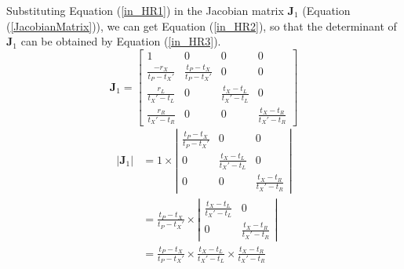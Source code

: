 \documentclass{bmcart}
\begin{document}
\begin{backmatter}
Substituting Equation (\ref{in_HR1}) in the Jacobian matrix ${{\mathbf{J}}_1}$ (Equation (\ref{JacobianMatrix})), we can get Equation (\ref{in_HR2}), so that the determinant of ${{\mathbf{J}}_1}$ can be obtained by Equation (\ref{in_HR3}).
\begin{equation}\label{in_HR2}
{{\mathbf{J}}_1} = \left[ {\begin{array}{*{20}{c}}
  1&0&0&0 \\
  {\frac{{ - {r_X}}}{{{t_P} - {t_X}'}}}&{\frac{{{t_P} - {t_X}}}{{{t_P} - {t_X}'}}}&0&0 \\
  {\frac{{{r_L}}}{{{t_X}' - {t_L}}}}&0&{\frac{{{t_X} - {t_L}}}{{{t_X}' - {t_L}}}}&0 \\
  {\frac{{{r_R}}}{{{t_X}' - {t_R}}}}&0&0&{\frac{{{t_X} - {t_R}}}{{{t_X}' - {t_R}}}}
\end{array}} \right]
\end{equation}
\begin{equation}\label{in_HR3}
\begin{aligned}
\left| {{{\mathbf{J}}_1}} \right| &= 1 \times \left| {\begin{array}{*{20}{c}}
  {\frac{{{t_P} - {t_X}}}{{{t_P} - {t_X}'}}}&0&0 \\
  0&{\frac{{{t_X} - {t_L}}}{{{t_X}' - {t_L}}}}&0 \\
  0&0&{\frac{{{t_X} - {t_R}}}{{{t_X}' - {t_R}}}}
\end{array}} \right| \\&= \frac{{{t_P} - {t_X}}}{{{t_P} - {t_X}'}} \times \left| {\begin{array}{*{20}{c}}
  {\frac{{{t_X} - {t_L}}}{{{t_X}' - {t_L}}}}&0 \\
  0&{\frac{{{t_X} - {t_R}}}{{{t_X}' - {t_R}}}}
\end{array}} \right| \\&= \frac{{{t_P} - {t_X}}}{{{t_P} - {t_X}'}} \times \frac{{{t_X} - {t_L}}}{{{t_X}' - {t_L}}} \times \frac{{{t_X} - {t_R}}}{{{t_X}' - {t_R}}}
\end{aligned}
\end{equation}


\end{backmatter}
\end{document}
